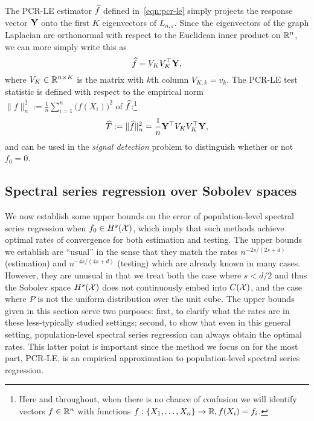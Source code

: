 The PCR-LE estimator $\widehat{f}$ defined in~\eqref{eqn:pcr-le} simply projects the response vector ${\bf Y}$ onto the first $K$ eigenvectors of $L_{n,\varepsilon}$. Since the eigenvectors of the graph Laplacian are orthonormal with respect to the Euclidean inner product on $\mathbb{R}^n$, we can more simply write this as
\begin{equation}
\label{eqn:laplacian_eigenmaps_estimator}
\widehat{f} = V_K V_K^{\top} {\bf Y},
\end{equation} 
where $V_K \in \mathbb{R}^{n \times K}$ is the matrix with $k$th column $V_{K,k} = v_k$. The PCR-LE test statistic is defined with respect to the empirical norm $\|f\|_{n}^2 := \frac{1}{n}\sum_{i = 1}^{n} \bigl(f(X_i)\bigr)^2$ of $\widehat{f}$:\footnote{Here and throughout, when there is no chance of confusion we will identify vectors $f \in \mathbb{R}^n$ with functions $f: \{X_1,\ldots,X_n\} \to \mathbb{R}, f(X_i) = f_i$.}
\begin{equation}
\label{eqn:laplacian_eigenmaps_test}
\widehat{T} := \|\widehat{f}\|_n^2 = \frac{1}{n} {\bf Y}^{\top} V_K V_K^{\top} {\bf Y},
\end{equation}
and can be used in the \emph{signal detection} problem to distinguish whether or not $f_0 = 0$.

\subsection{Spectral series regression over Sobolev spaces}
\label{subsec:spectral_projection}
We now establish some upper bounds on the error of population-level spectral series regression when $f_0 \in H^s(\mathcal{X})$, which imply that such methods achieve optimal rates of convergence for both estimation and testing. The upper bounds we establish are ``usual'' in the sense that they match the rates $n^{-2s/(2s + d)}$ (estimation) and $n^{-4s/(4s + d)}$ (testing) which are already known in many cases. However, they are unusual in that we treat both the case where $s < d/2$ and thus the Sobolev space $H^s(\mathcal{X})$ does not continuously embed into $C(\mathcal{X})$, and the case where $P$ is not the uniform distribution over the unit cube. The upper bounds given in this section serve two purposes: first, to clarify what the rates are in these less-typically studied settings; second, to show that even in this general setting, population-level spectral series regression can always obtain the optimal rates. This latter point is important since the method we focus on for the most part, PCR-LE, is an empirical approximation to population-level spectral series regression.

